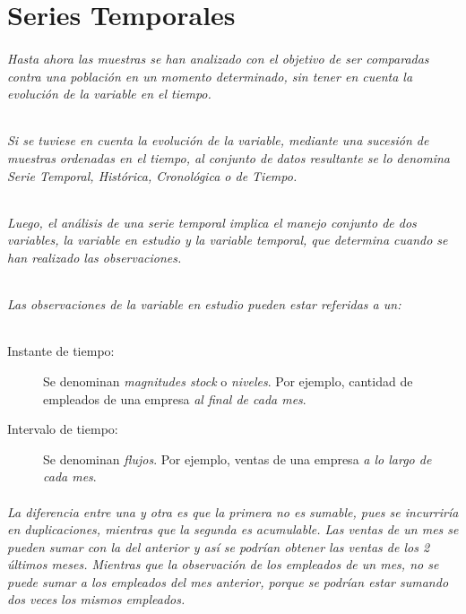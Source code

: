 \part{Series Temporales}
\paragraph{
Hasta ahora las muestras se han analizado con el objetivo de ser comparadas contra una población en un momento determinado, sin tener en cuenta la evolución de la variable en el tiempo.
}
\paragraph{
Si se tuviese en cuenta la evolución de la variable, mediante una sucesión de muestras ordenadas en el tiempo, al conjunto de datos resultante se lo denomina Serie Temporal, Histórica, Cronológica o de Tiempo\cite{SANSERIES}.
}
\paragraph{
Luego, el análisis de una serie temporal implica el manejo conjunto de dos variables, la variable en estudio y la variable temporal, que determina cuando se han realizado las observaciones.
}
\paragraph{
Las observaciones de la variable en estudio pueden estar referidas a un:
}
\begin{description}
\item[Instante de tiempo:] Se denominan \emph{magnitudes stock} o \emph{niveles}. Por ejemplo, cantidad de empleados de una empresa \emph{al final de cada mes}.
\item[Intervalo de tiempo:] Se denominan \emph{flujos}. Por ejemplo, ventas de una empresa \emph{a lo largo de cada mes}.
\end{description}
\paragraph{
La diferencia entre una y otra es que la primera no es sumable, pues se incurriría en duplicaciones, mientras que la segunda es acumulable. Las ventas de un mes se pueden sumar con la del anterior y así se podrían obtener las ventas de los 2 últimos meses. Mientras que la observación de los empleados de un mes, no se puede sumar a los empleados del mes anterior, porque se podrían estar sumando dos veces los mismos empleados. 
}
